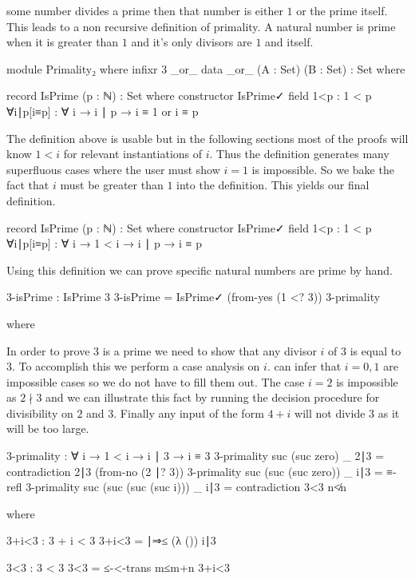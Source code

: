 \documentclass[./Thesis.tex]{subfiles}
\begin{document}
some number divides a prime then that number is either $1$ or the prime itself.
This leads to a non recursive definition of primality. A natural number is prime
when it is greater than $1$ and it's only divisors are $1$ and itself.
\begin{code}[hide]
  module Primality₂ where
    infixr 3 _or_
    data _or_ (A : Set) (B : Set) : Set where
\end{code}
\begin{code}
    record IsPrime (p : ℕ) : Set where
      constructor IsPrime✓
      field
        1<p : 1 < p
        ∀i∣p[i≡p] : ∀ {i} → i ∣ p → i ≡ 1 or i ≡ p
\end{code}
The definition above is usable but in the following sections most of the proofs
will know $1 < i$ for relevant instantiations of $i$. Thus the definition
generates many superfluous cases where the user must show $i = 1$ is impossible.
So we bake the fact that $i$ must be greater than $1$ into the definition. This
yields our final definition.
\begin{code}
  record IsPrime (p : ℕ) : Set where
    constructor IsPrime✓
    field
      1<p : 1 < p
      ∀i∣p[i≡p] : ∀ {i} → 1 < i → i ∣ p → i ≡ p
\end{code}
Using this definition we can prove specific natural numbers are prime by hand.
\begin{code}
  3-isPrime : IsPrime 3
  3-isPrime = IsPrime✓ (from-yes (1 <? 3)) 3-primality
\end{code}
\begin{code}[hide]
    where
\end{code}
In order to prove $3$ is a prime we need to show that any divisor $i$ of $3$ is
equal to $3$. To accomplish this we perform a case analysis on $i$. \Agda{} can
infer that $i = 0, 1$ are impossible cases so we do not have to fill them out.
The case $i = 2$ is impossible as $2 \nmid 3$ and we can illustrate this fact by
running the decision procedure for divisibility on $2$ and $3$. Finally any
input of the form $4 + i$ will not divide $3$ as it will be too large.
\begin{code}
    3-primality : ∀ {i} → 1 < i → i ∣ 3 → i ≡ 3
    3-primality {suc (suc zero)} _ 2∣3 = contradiction 2∣3 (from-no (2 ∣? 3))
    3-primality {suc (suc (suc zero))} _ i∣3 = ≡-refl
    3-primality {suc (suc (suc (suc i)))} _ i∣3 = contradiction 3<3 n≮n
\end{code}
\begin{code}[hide]
      where
\end{code}
\begin{code}
      3+i<3 : 3 + i < 3
      3+i<3 = ∣⇒≤ (λ ()) i∣3

      3<3 : 3 < 3
      3<3 = ≤-<-trans m≤m+n 3+i<3
\end{code}
\end{document}
